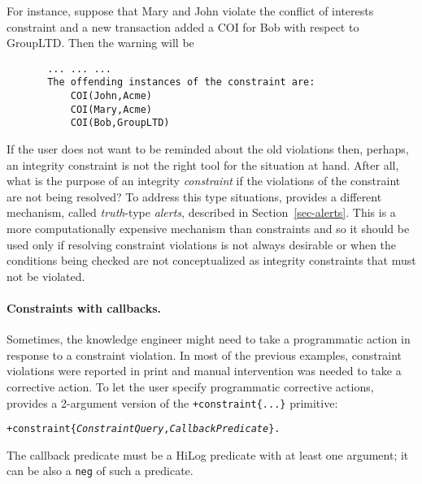 For instance, suppose that Mary and John violate the conflict of interests
constraint and a new transaction added a COI for Bob with respect to
GroupLTD. Then the warning will be
\begin{verbatim}
       ... ... ...
       The offending instances of the constraint are:
           COI(John,Acme)
           COI(Mary,Acme)
           COI(Bob,GroupLTD)
\end{verbatim}
If the user does not want to be reminded about the old violations then,
perhaps, an integrity constraint is not the right tool for the situation at
hand. After all, what is the purpose of an integrity \emph{constraint} if
the violations of the constraint are not being resolved?
To address this type situations, \ERGO provides a different mechanism,
called \emph{truth}-type \emph{alerts}, described in Section~\ref{sec-alerts}.
This is a more computationally expensive mechanism than constraints and so
it should be used only if resolving constraint violations is not always
desirable or when the conditions being checked are not conceptualized as
integrity constraints that must not be violated.


\paragraph{Constraints with callbacks.}
Sometimes, the knowledge engineer might need to take a programmatic action
in response to a constraint violation. In most of the
previous examples, constraint
violations were reported in print and manual intervention was needed
to take a corrective action. To let the user specify programmatic
corrective actions, \ERGO provides a 2-argument version of
the \texttt{+constraint\{...\}} primitive:
\begin{alltt}
     +constraint\{\textnormal{\emph{ConstraintQuery},\emph{CallbackPredicate}}\}.
\end{alltt}
The callback predicate must be a HiLog predicate with at least one
argument; it can be also a \texttt{\bs{}neg} of such a predicate. 



